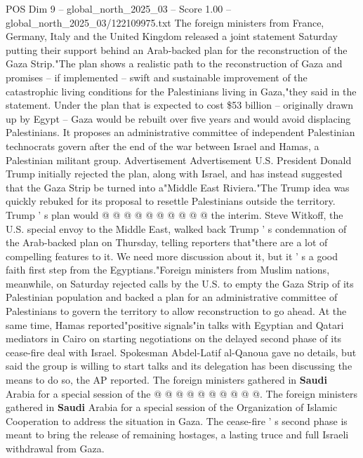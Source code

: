 \begin{textsample}{POS Dim 9 – global\_north\_2025\_03 – Score 1.00 – global\_north\_2025\_03/122109975.txt}  \label{ex:f9_pos_303}
The foreign ministers from France, Germany, Italy and the United Kingdom released a joint statement Saturday putting their support behind an Arab-backed plan for the reconstruction of the Gaza Strip."The plan shows a realistic path to the reconstruction of Gaza and promises -- if implemented -- swift and sustainable improvement of the catastrophic living conditions for the Palestinians living in Gaza,"they said in the statement.
Under the plan that is expected to cost \$53 billion -- originally drawn up by Egypt -- Gaza would be rebuilt over five years and would avoid displacing Palestinians.
It proposes an administrative committee of independent Palestinian technocrats govern after the end of the war between Israel and Hamas, a Palestinian militant group.
Advertisement Advertisement U.S.
President Donald Trump initially rejected the plan, along with Israel, and has instead suggested that the Gaza Strip be turned into a"Middle East Riviera."The Trump idea was quickly rebuked for its proposal to resettle Palestinians outside the territory.
Trump ' s plan would @ @ @ @ @ @ @ @ @ @ the interim.
Steve Witkoff, the U.S. special envoy to the Middle East, walked back Trump ' s condemnation of the Arab-backed plan on Thursday, telling reporters that"there are a lot of compelling features to it.
We need more discussion about it, but it ' s a good faith first step from the Egyptians."Foreign ministers from Muslim nations, meanwhile, on Saturday rejected calls by the U.S. to empty the Gaza Strip of its Palestinian population and backed a plan for an administrative committee of Palestinians to govern the territory to allow reconstruction to go ahead.
At the same time, Hamas reported"positive signals"in talks with Egyptian and Qatari mediators in Cairo on starting negotiations on the delayed second phase of its cease-fire deal with Israel.
Spokesman Abdel-Latif al-Qanoua gave no details, but said the group is willing to start talks and its delegation has been discussing the means to do so, the AP reported.
The foreign ministers gathered in \textbf{Saudi} Arabia for a special session of the @ @ @ @ @ @ @ @ @ @.
The foreign ministers gathered in \textbf{Saudi} Arabia for a special session of the Organization of Islamic Cooperation to address the situation in Gaza.
The cease-fire ' s second phase is meant to bring the release of remaining hostages, a lasting truce and full Israeli withdrawal from Gaza.

\end{textsample}

